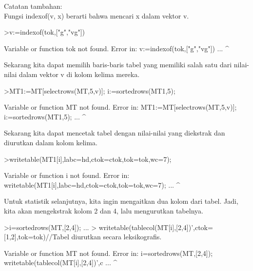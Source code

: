\documentclass[a4paper,10pt]{article}
\begin{document}
\begin{eulernotebook}
\begin{eulercomment}
Catatan tambahan:\\
Fungsi indexof(v, x) berarti bahwa mencari x dalam vektor v.
\end{eulercomment}
\begin{eulerprompt}
>v:=indexof(tok,["g","vg"])
\end{eulerprompt}
\begin{euleroutput}
  Variable or function tok not found.
  Error in:
  v:=indexof(tok,["g","vg"]) ...
                ^
\end{euleroutput}
\begin{eulercomment}
Sekarang kita dapat memilih baris-baris tabel yang memiliki salah satu
dari nilai-nilai dalam vektor v di kolom kelima mereka.
\end{eulercomment}
\begin{eulerprompt}
>MT1:=MT[selectrows(MT,5,v)]; i:=sortedrows(MT1,5);
\end{eulerprompt}
\begin{euleroutput}
  Variable or function MT not found.
  Error in:
  MT1:=MT[selectrows(MT,5,v)]; i:=sortedrows(MT1,5); ...
                       ^
\end{euleroutput}
\begin{eulercomment}
Sekarang kita dapat mencetak tabel dengan nilai-nilai yang diekstrak
dan diurutkan dalam kolom kelima.
\end{eulercomment}
\begin{eulerprompt}
>writetable(MT1[i],labc=hd,ctok=ctok,tok=tok,wc=7);
\end{eulerprompt}
\begin{euleroutput}
  Variable or function i not found.
  Error in:
  writetable(MT1[i],labc=hd,ctok=ctok,tok=tok,wc=7); ...
                  ^
\end{euleroutput}
\begin{eulercomment}
Untuk statistik selanjutnya, kita ingin mengaitkan dua kolom dari
tabel. Jadi, kita akan mengekstrak kolom 2 dan 4, lalu mengurutkan
tabelnya.
\end{eulercomment}
\begin{eulerprompt}
>i=sortedrows(MT,[2,4]);  ...
>  writetable(tablecol(MT[i],[2,4])',ctok=[1,2],tok=tok)//Tabel diurutkan secara leksikografis.
\end{eulerprompt}
\begin{euleroutput}
  Variable or function MT not found.
  Error in:
  i=sortedrows(MT,[2,4]);    writetable(tablecol(MT[i],[2,4])',c ...
                 ^
\end{euleroutput}

\end{eulernotebook}
\end{document}
